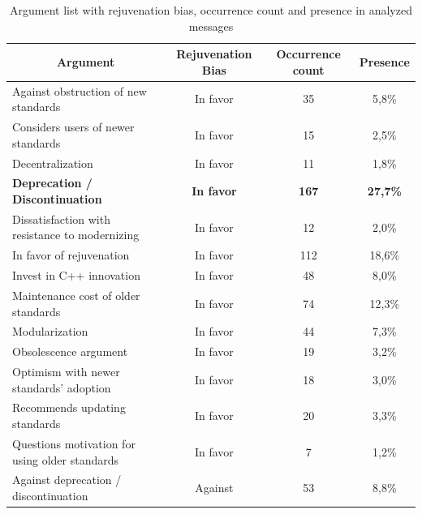 \begin{table}
\caption{Argument list with rejuvenation bias, occurrence count and presence in analyzed messages}
  \label{tab:argument_list}
\begin{tabular}{@{}lccc@{}}
\multicolumn{1}{c}{\textbf{Argument}}          & \textbf{Rejuvenation Bias} & \textbf{Occurrence count} & \textbf{Presence} \\ \midrule
Against obstruction of new standards           & In favor                   & 35                        & 5,8\%             \\
Considers users of newer standards             & In favor                   & 15                        & 2,5\%             \\
Decentralization                               & In favor                   & 11                        & 1,8\%             \\
\textbf{Deprecation / Discontinuation}         & \textbf{In favor}          & \textbf{167}              & \textbf{27,7\%}   \\
Dissatisfaction with resistance to modernizing & In favor                   & 12                        & 2,0\%             \\
In favor of rejuvenation                       & In favor                   & 112                       & 18,6\%            \\
Invest in C++ innovation                       & In favor                   & 48                        & 8,0\%             \\
Maintenance cost of older standards            & In favor                   & 74                        & 12,3\%            \\
Modularization                                 & In favor                   & 44                        & 7,3\%             \\
Obsolescence argument                          & In favor                   & 19                        & 3,2\%             \\
Optimism with newer standards' adoption        & In favor                   & 18                        & 3,0\%             \\
Recommends updating standards                  & In favor                   & 20                        & 3,3\%             \\
Questions motivation for using older standards & In favor                   & 7                         & 1,2\%             \\
Against deprecation / discontinuation          & Against                    & 53                        & 8,8\%             \\

\end{tabular}
\end{table}
